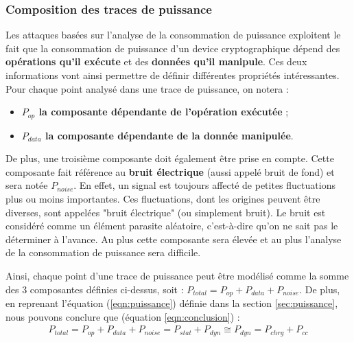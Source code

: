 \documentclass[10pt, oneside, a4paper]{article}
\begin{document}
\vspace{-0.2 cm}
\subsubsection{Composition des traces de puissance}
\vspace{-0.1 cm}Les attaques basées sur l'analyse de la consommation de puissance exploitent le fait que la consommation de puissance d'un device cryptographique dépend des \textbf{opérations qu'il exécute} et des \textbf{données qu'il manipule}. Ces deux informations vont ainsi permettre de définir différentes propriétés intéressantes. Pour chaque point analysé dans une trace de puissance, on notera :
\begin{itemize}
\item \textbf{$P_{op}$ la composante dépendante de l'opération exécutée} ;
\item \textbf{$P_{data}$ la composante dépendante de la donnée manipulée}. \\
\end{itemize}
\vspace{-0.2 cm}De plus, une troisième composante doit également être prise en compte. Cette composante fait référence au \textbf{bruit électrique} (aussi appelé bruit de fond) et sera notée \textbf{$P_{noise}$}. En effet, un signal est toujours affecté de petites fluctuations plus ou moins importantes. Ces fluctuations, dont les origines peuvent être diverses, sont appelées "bruit électrique" (ou simplement bruit). Le bruit est considéré comme un élément parasite aléatoire, c'est-à-dire qu'on ne sait pas le déterminer à l'avance. Au plus cette composante sera élevée et au plus l'analyse de la consommation de puissance sera difficile.

Ainsi, chaque point d'une trace de puissance peut être modélisé comme la somme des 3 composantes définies ci-dessus, soit : 
$P_{total} = P_{op} + P_{data} + P_{noise}$. De plus, en reprenant l'équation (\ref{eqn:puissance}) définie dans la section \ref{sec:puissance}, nous pouvons conclure que (équation \ref{eqn:conclusion}) :
\begin{gather}
	P_{total} = P_{op} + P_{data} + P_{noise} = P_{stat} + P_{dyn} \cong  P_{dyn} = P_{chrg} + P_{cc}\label{eqn:conclusion}
\end{gather}
\end{document}
